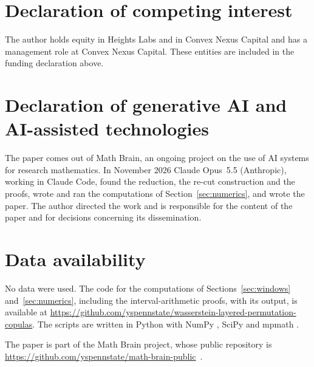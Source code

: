 \documentclass[11pt]{amsart}
\theoremstyle{definition}
\theoremstyle{remark}
\numberwithin{equation}{section}
\begin{document}
\section*{Declaration of competing interest}
The author holds equity in Heights Labs and in Convex Nexus Capital and
has a management role at Convex Nexus Capital. These entities are included
in the funding declaration above.

\section*{Declaration of generative AI and AI-assisted technologies}
The paper comes out of Math Brain, an ongoing project on the use of AI systems for research mathematics. In November 2026
Claude Opus~5.5 (Anthropic), working in Claude Code, found the reduction, the re-cut construction and the proofs, wrote and
ran the computations of Section~\ref{sec:numerics}, and wrote the paper. The author directed the work and is responsible
for the content of the paper and for decisions concerning its dissemination.

\section*{Data availability}
No data were used. The code for the computations of Sections~\ref{sec:windows} and~\ref{sec:numerics}, including the
interval-arithmetic proofs, with its output, is available at
\url{https://github.com/yspennstate/wasserstein-layered-permutation-copulas}. The scripts are written in Python with
NumPy \cite{numpy}, SciPy \cite{scipy} and mpmath \cite{mpmath}.

The paper is part of the Math Brain project, whose public repository is \url{https://github.com/yspennstate/math-brain-public}~\cite{MathBrainRepo}.
\end{document}
